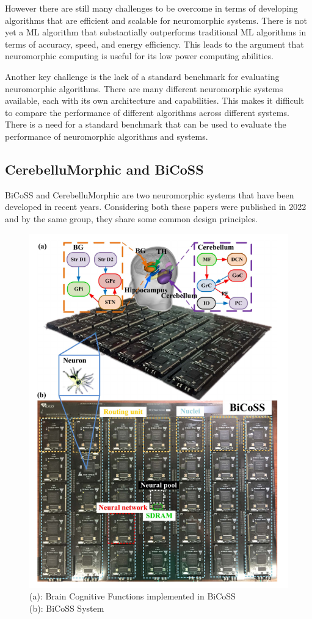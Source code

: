 \documentclass[screen, acmtog]{acmart}
\begin{document}
However there are still many challenges to be overcome in terms of developing algorithms that are efficient and scalable for neuromorphic systems. There is not yet a ML algorithm that substantially outperforms traditional ML algorithms in terms of accuracy, speed, and energy efficiency. This leads to the argument that neuromorphic computing is useful for its low power computing abilities.

Another key challenge is the lack of a standard benchmark for evaluating neuromorphic algorithms. There are many different neuromorphic systems available, each with its own architecture and capabilities. This makes it difficult to compare the performance of different algorithms across different systems. There is a need for a standard benchmark that can be used to evaluate the performance of neuromorphic algorithms and systems.

\subsection{CerebelluMorphic\cite{CerebelluMorphic} and BiCoSS\cite{BiCoss}}

BiCoSS and CerebelluMorphic are two neuromorphic systems that have been developed in recent years. Considering both these papers were published in 2022 and by the same group, they share some common design principles.

\begin{figure}
    \centering
    \includegraphics[width=0.8\linewidth]{bicoss.png}
    \caption{\cite{BiCoss} (a): Brain Cognitive Functions implemented in BiCoSS  \\ (b): BiCoSS System}
    \label{fig:bicoss}
\end{figure}
\end{document}
